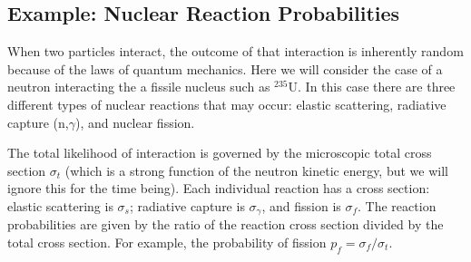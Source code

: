 \subsection{Example: Nuclear Reaction Probabilities}

When two particles interact, the outcome of that interaction is inherently random because of the laws of quantum mechanics. Here we will consider the case of a neutron interacting the a fissile nucleus such as $^{235}$U. In this case there are three different types of nuclear reactions that may occur: elastic scattering, radiative capture (n,$\gamma$), and nuclear fission. 

The total likelihood of interaction is governed by the microscopic total cross section $\sigma_t$ (which is a strong function of the neutron kinetic energy, but we will ignore this for the time being). Each individual reaction has a cross section: elastic scattering is $\sigma_s$; radiative capture is $\sigma_\gamma$, and fission is $\sigma_f$. The reaction probabilities are given by the ratio of the reaction cross section divided by the total cross section. For example, the probability of fission $p_f = \sigma_f / \sigma_t$.

